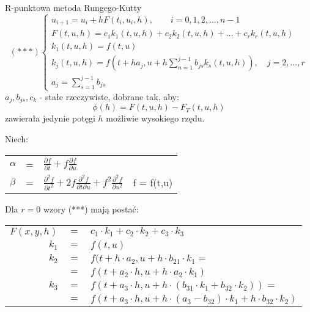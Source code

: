 \begin{frame}{R-punktowa metoda Rungego-Kutty}
	$$(***)\left\{\begin{array}{l}
	u_{i+1} = u_i + h F(t_i,u_i,h), \qquad i = 0,1,2,\ldots,n-1\\
    F(t,u,h) = c_1k_1(t,u,h) + c_2k_2(t,u,h)+\ldots+c_rk_r(t,u,h)\\
    k_1(t,u,h) = f(t,u) \\
    k_j(t,u,h) = f(t+ha_j,u+h \sum_{n=1}^{j-1}b_{js}k_s(t,u,h)), \quad j = 2,\ldots,r \\
    a_j = \sum_{s=1}^{j-1}b_{js}
	\end{array}\right.$$
    $a_j, b_{js}, c_k$ - stałe rzeczywiste, dobrane tak, aby:
    $$\phi(h) = F(t,u,h) - F_T(t,u,h)$$
    zawierała jedynie potęgi $h$ możliwie wysokiego rzędu. 	
\end{frame}
\begin{frame}
	Niech:
    \begin{tabular}{lcll}
    $\alpha$ & = & $\frac{\partial f}{\partial t}+f\frac{\partial f}{\partial u}$ & \\
    $\beta$ & = & $\frac{\partial^2f}{\partial t^2}+2f\frac{\partial^2f}{\partial t \partial u}+f^2\frac{\partial^2f}{\partial u^2}$ & f = f(t,u)
    \end{tabular}
 	\newline \newline \par
    Dla $r = 0$ wzory (***) mają postać:
   	\newline
    \begin{tabular}{rcl}
    	$F(x,y,h)$ & $=$ & $c_1 \cdot k_1 + c_2 \cdot k_2 + c_3 \cdot k_3$ \\
        $k_1$ & $=$ & $f(t,u)$ \\
        $k_2$ & $=$ & $f(t + h \cdot a_2, u + h \cdot b_{21} \cdot k_1 =$ \\
         & $=$ & $f(t+a_2 \cdot h, u+h \cdot a_2 \cdot k_1) $\\
        $k_3$ & $=$ & $f(t+a_3 \cdot h, u+h \cdot (b_{31} \cdot k_1 + b_{32} \cdot k_2)) = $ \\
         & $=$ & $f(t+a_3 \cdot h, u+h \cdot (a_3 - b_{32}) \cdot k_1 + h \cdot b_{32} \cdot k_2)$
    \end{tabular}
\end{frame}
